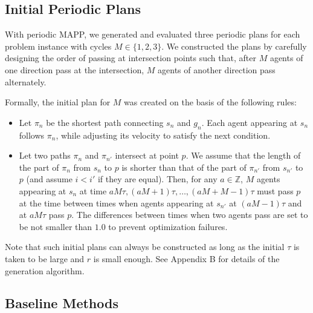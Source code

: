 \documentclass[letterpaper]{article} %
\begin{document}
\subsection{Initial Periodic Plans}
With periodic MAPP, we generated and evaluated three periodic plans for each problem instance with cycles $M \in \{1, 2, 3\}$.
We constructed the plans by carefully designing the order of passing at intersection points such that, after $M$ agents of one direction pass at the intersection, $M$ agents of another direction pass alternately.

Formally, the initial plan for $M$ was created on the basis of the following rules:
\begin{itemize}
    \item Let $\pi_n$ be the shortest path connecting $s_n$ and $g_n$. Each agent appearing at $s_n$ follows $\pi_n$, while adjusting its velocity to satisfy the next condition.
    \item Let two paths $\pi_n$ and $\pi_{n'}$ intersect at point $p$. We assume that the length of the part of $\pi_n$ from $s_n$ to $p$ is shorter than that of the part of $\pi_{n'}$ from $s_{n'}$ to $p$ (and assume $i<i'$ if they are equal). Then, for any $a \in \mathbb{Z}$, $M$ agents appearing at $s_n$ at time $aM\tau, (aM+1)\tau, \ldots, (aM+M-1)\tau$ must pass $p$ at the time between times when agents appearing at $s_{n'}$ at $(aM-1)\tau$ and at $aM\tau$ pass $p$. The differences between times when two agents pass are set to be not smaller than $1.0$ to prevent optimization failures.

\end{itemize}
Note that such initial plans can always be constructed as long as the initial $\tau$ is taken to be large and $r$ is small enough. See Appendix B for details of the generation algorithm.

\subsection{Baseline Methods}
\end{document}

